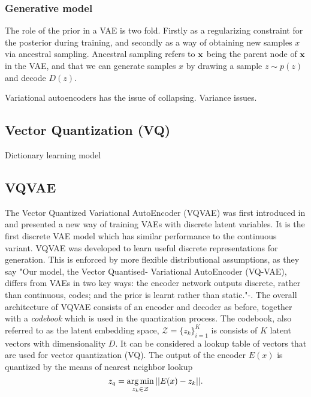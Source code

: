 \documentclass[../../thesis.tex]{subfiles}
\begin{document}
\subsubsection{Generative model}
The role of the prior in a VAE is two fold. Firstly as a regularizing constraint for the posterior during training, and secondly as a way of obtaining new samples $x$ via ancestral sampling. Ancestral sampling refers to $\mathbf{x}$ being the parent node of $\mathbf{x}$ in the VAE, and that we can generate samples $x$ by drawing a sample $z\sim p(z)$ and decode $D(z)$. 





Variational autoencoders has the issue of collapsing. Variance issues.


\subsection{Vector Quantization (VQ)}
Dictionary learning model \cite{Gray1984VQ}

\subsection{VQVAE}
The Vector Quantized Variational AutoEncoder (VQVAE) was first introduced in \cite{VQVAE} and presented a new way of training VAEs with discrete latent variables. It is the first discrete VAE model which has similar performance to the continuous variant. VQVAE was developed to learn useful discrete representations for generation. This is enforced by more flexible distributional assumptions, as they say "Our model, the Vector Quantised-
Variational AutoEncoder (VQ-VAE), differs from VAEs in two key ways: the
encoder network outputs discrete, rather than continuous, codes; and the prior
is learnt rather than static."-\cite{VQVAE}. 
\newline
The overall architecture of VQVAE consists of an encoder and decoder as before, together with a \textit{codebook} which is used in the quantization process. The codebook, also referred to as the latent embedding space, $\mathcal{Z} = \{z_k\}_{i=1}^K$ is consists of $K$ latent vectors with dimensionality $D$. It can be considered a lookup table of vectors that are used for vector quantization (VQ). The output of the encoder $E(x)$ is quantized by the means of nearest neighbor lookup
\begin{equation}
    z_q = \operatorname*{arg\,min}_{z_k\in\mathcal{Z}} ||E(x)-z_k||.
\end{equation}
\end{document}
